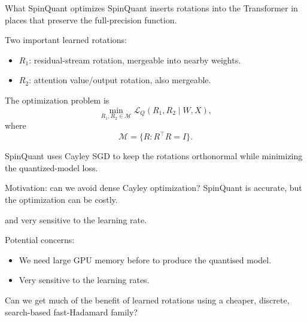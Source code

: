 \documentclass[aspectratio=169,11pt]{beamer}
\begin{document}

\begin{frame}{What SpinQuant optimizes}
SpinQuant inserts rotations into the Transformer in places that preserve the full-precision function.

\vspace{0.2cm}
Two important learned rotations:
\begin{itemize}
  \item $R_1$: residual-stream rotation, mergeable into nearby weights.
  \item $R_2$: attention value/output rotation, also mergeable.
\end{itemize}

\vspace{0.2cm}
The optimization problem is
\[
\min_{R_1,R_2\in\mathcal M} \mathcal L_Q(R_1,R_2\mid W,X),
\]
where
\[
\mathcal M = \{R: R^\top R = I\}.
\]

\vspace{0.2cm}
SpinQuant uses Cayley SGD to keep the rotations orthonormal while minimizing the quantized-model loss.
\end{frame}

\begin{frame}{Motivation: can we avoid dense Cayley optimization?}
SpinQuant is accurate, but the optimization can be costly.

and very sensitive to the learning rate.

\vspace{0.2cm}
Potential concerns:
\begin{itemize}
  \item We need large GPU memory before to produce the quantised model.
  \item Very sensitive to the learning rates.
\end{itemize}

\vspace{0.3cm}

Can we get much of the benefit of learned rotations using a cheaper, discrete, search-based fast-Hadamard family?
\end{frame}
\end{document}
